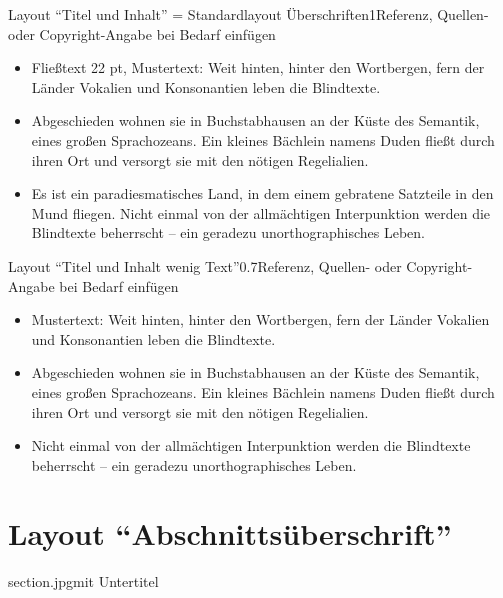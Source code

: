 \documentclass[hyperref={pdfpagelabels=false}, aspectratio=43, t]{beamer}  %
\begin{document}
\begin{textFrame}{Layout ``Titel und Inhalt'' = Standardlayout Überschriften}{1}{Referenz, Quellen- oder Copyright-Angabe bei Bedarf einfügen}

	\begin{itemize}
		\item Fließtext 22 pt, Mustertext: Weit hinten, hinter den Wortbergen, fern der Länder Vokalien und Konsonantien leben die Blindtexte.
		\item Abgeschieden wohnen sie in Buchstabhausen an der Küste des Semantik, eines großen Sprachozeans. Ein kleines Bächlein namens Duden fließt durch ihren Ort und versorgt sie mit den nötigen Regelialien.
		\item Es ist ein paradiesmatisches Land, in dem einem gebratene Satzteile in den Mund fliegen. Nicht einmal von der allmächtigen Interpunktion werden die Blindtexte beherrscht – ein geradezu unorthographisches Leben.

	\end{itemize}
\end{textFrame}

\begin{textFrame}{Layout ``Titel und Inhalt wenig Text''}{0.7}{Referenz, Quellen- oder Copyright-Angabe bei Bedarf einfügen}

	\begin{itemize}
		\item Mustertext: Weit hinten, hinter den Wortbergen, fern der Länder Vokalien und Konsonantien leben die Blindtexte.
		\item Abgeschieden wohnen sie in Buchstabhausen an der Küste des Semantik, eines großen Sprachozeans. Ein kleines Bächlein namens Duden fließt durch ihren Ort und versorgt sie mit den nötigen Regelialien.
		\item Nicht einmal von der allmächtigen Interpunktion werden die Blindtexte beherrscht – ein geradezu unorthographisches Leben.
	\end{itemize}
\end{textFrame}



\section{Layout ``Abschnittsüberschrift''}

\begin{sectionFrame}{section.jpg}{mit Untertitel}
\end{sectionFrame}
\end{document}
